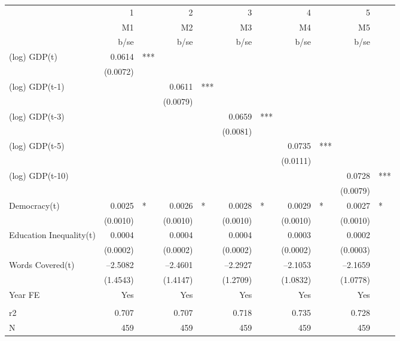 \begin{tabular} {l* {5}{r @{} l}}
\hline
            &           1&   &           2&   &           3&   &           4&   &           5&   \\
            &          M1&   &          M2&   &          M3&   &          M4&   &          M5&   \\
            &        b/se&   &        b/se&   &        b/se&   &        b/se&   &        b/se&   \\
\hline
(log) GDP(t)&      0.0614&***&            &   &            &   &            &   &            &   \\
            &    (0.0072)&   &            &   &            &   &            &   &            &   \\
(log) GDP(t-1)&            &   &      0.0611&***&            &   &            &   &            &   \\
            &            &   &    (0.0079)&   &            &   &            &   &            &   \\
(log) GDP(t-3)&            &   &            &   &      0.0659&***&            &   &            &   \\
            &            &   &            &   &    (0.0081)&   &            &   &            &   \\
(log) GDP(t-5)&            &   &            &   &            &   &      0.0735&***&            &   \\
            &            &   &            &   &            &   &    (0.0111)&   &            &   \\
(log) GDP(t-10)&            &   &            &   &            &   &            &   &      0.0728&***\\
            &            &   &            &   &            &   &            &   &    (0.0079)&   \\
Democracy(t)&      0.0025&*  &      0.0026&*  &      0.0028&*  &      0.0029&*  &      0.0027&*  \\
            &    (0.0010)&   &    (0.0010)&   &    (0.0010)&   &    (0.0010)&   &    (0.0010)&   \\
Education Inequality(t)&      0.0004&   &      0.0004&   &      0.0004&   &      0.0003&   &      0.0002&   \\
            &    (0.0002)&   &    (0.0002)&   &    (0.0002)&   &    (0.0002)&   &    (0.0003)&   \\
Words Covered(t)&    --2.5082&   &    --2.4601&   &    --2.2927&   &    --2.1053&   &    --2.1659&   \\
            &    (1.4543)&   &    (1.4147)&   &    (1.2709)&   &    (1.0832)&   &    (1.0778)&   \\
Year FE     &         Yes&   &         Yes&   &         Yes&   &         Yes&   &         Yes&   \\
 \\
r2          &       0.707&   &       0.707&   &       0.718&   &       0.735&   &       0.728&   \\
N           &         459&   &         459&   &         459&   &         459&   &         459&   \\
\hline
\end{tabular}
